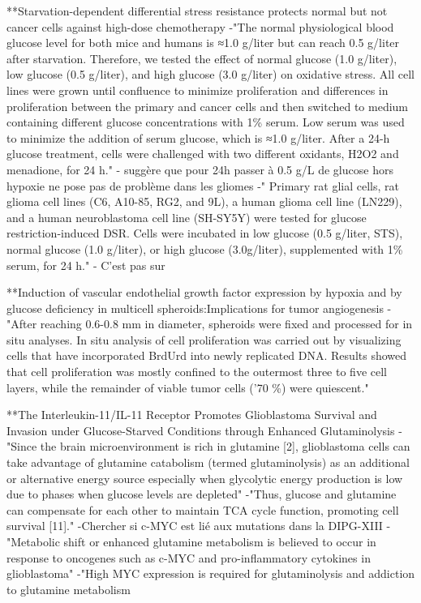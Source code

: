 \documentclass[11pt,a4paper]{article}
\begin{document}
**Starvation-dependent differential stress resistance protects normal but not cancer cells against high-dose chemotherapy
-"The normal physiological blood glucose level for both mice and humans is ≈1.0 g/liter but can reach 0.5 g/liter after starvation. Therefore, we tested the effect of normal glucose (1.0 g/liter), low glucose (0.5 g/liter), and high glucose (3.0 g/liter) on oxidative stress. All cell lines were grown until confluence to minimize proliferation and differences in proliferation between the primary and cancer cells and then switched to medium containing different glucose concentrations with 1\% serum. Low serum was used to minimize the addition of serum glucose, which is ≈1.0 g/liter. After a 24-h glucose treatment, cells were challenged with two different oxidants, H2O2 and menadione, for 24 h."
- suggère que pour 24h passer à 0.5 g/L de glucose hors hypoxie ne pose pas de problème dans les gliomes
-" Primary rat glial cells, rat glioma cell lines (C6, A10-85, RG2, and 9L), a human glioma cell line (LN229), and a human neuroblastoma cell line (SH-SY5Y) were tested for glucose restriction-induced DSR. Cells were incubated in low glucose (0.5 g/liter, STS), normal glucose (1.0 g/liter), or high glucose (3.0g/liter), supplemented with 1\% serum, for 24 h."
- C'est pas sur

**Induction of vascular endothelial growth factor expression by hypoxia and by glucose deficiency in multicell spheroids:Implications for tumor angiogenesis
-"After reaching 0.6-0.8 mm in diameter, spheroids were fixed and processed for in situ analyses. In situ analysis of cell proliferation was carried out by
visualizing cells that have incorporated BrdUrd into newly replicated DNA. Results showed that cell proliferation was mostly confined to the outermost three to five cell layers, while the remainder of viable tumor cells ('70 \%) were quiescent."

**The Interleukin-11/IL-11 Receptor Promotes Glioblastoma Survival and Invasion under Glucose-Starved Conditions through Enhanced Glutaminolysis
-"Since the brain microenvironment is rich in glutamine [2], glioblastoma cells can take advantage of glutamine catabolism (termed glutaminolysis) as an additional or alternative energy source especially when glycolytic energy production is low due to phases when glucose levels are depleted"
-"Thus, glucose and glutamine can compensate for each other to maintain TCA cycle function, promoting cell survival [11]."
-Chercher si c-MYC est lié aux mutations dans la DIPG-XIII
-"Metabolic shift or enhanced glutamine metabolism is believed to occur in response to oncogenes such as c-MYC and pro-inflammatory cytokines in glioblastoma"
-"High MYC expression is required for glutaminolysis and addiction to glutamine metabolism 
\end{document}
